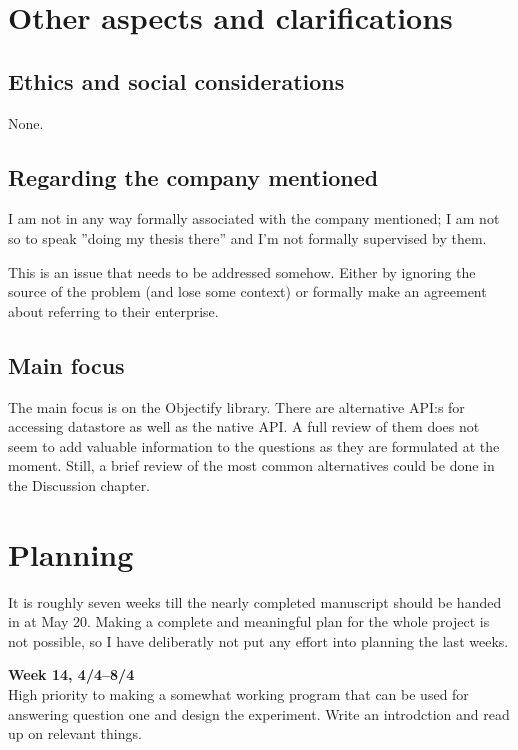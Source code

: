 \documentclass[10pt, titlepage, oneside, a4paper]{article}
\begin{document}
\section*{Other aspects and clarifications}

\subsection*{Ethics and social considerations}

None.

\subsection*{Regarding the company mentioned}

I am not in any way formally associated with the company mentioned; I
am not so to speak ''doing my thesis there'' and I'm not formally
supervised by them.

This is an issue that needs to be addressed somehow. Either by ignoring
the source of the problem (and lose some context) or formally make
an agreement about referring to their enterprise. 

\subsection*{Main focus}

The main focus is on the Objectify library. There are alternative
API:s for accessing datastore as well as the native API. A full review
of them does not seem to add valuable information to the questions as
they are formulated at the moment. Still, a brief review of the most
common alternatives could be done in the Discussion chapter.

\newpage

\section*{Planning}

It is roughly seven weeks till the nearly completed manuscript should
be handed in at May 20. Making a complete and meaningful plan for the
whole project is not possible, so I have deliberatly not put any
effort into planning the last weeks.

\textbf{Week 14, 4/4--8/4}\\
High priority to making a somewhat working program that can be used
for answering question one and design the experiment. Write an introdction and read up on relevant things.
\end{document}
